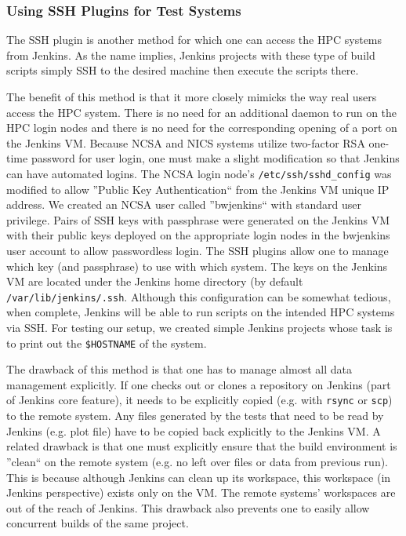 \documentclass[10pt, conference, compsocconf]{IEEEtran}
\begin{document}
\subsubsection{Using SSH Plugins for Test Systems}
The SSH plugin \cite{JenkinsSSHPlugin} is another method for which one can access the HPC systems from Jenkins. 
As the name implies, Jenkins projects with these type of build scripts simply SSH to the desired machine then execute the scripts there. 


The benefit of this method is that it more closely mimicks the way real users access the HPC system. 
There is no need for an additional daemon to run on the HPC login nodes and there is no need for the corresponding opening of a port on the Jenkins VM. 
Because NCSA and NICS systems utilize two-factor RSA one-time password for user login, one must make a slight modification so that Jenkins can have automated logins. 
The NCSA login node's \texttt{/etc/ssh/sshd_config} was modified to allow ''Public Key Authentication`` from the Jenkins VM unique IP address. 
We created an NCSA user called ''bwjenkins`` with standard user privilege. 
Pairs of SSH keys with passphrase were generated on the Jenkins VM with their public keys deployed on the appropriate login nodes in the bwjenkins user account to allow passwordless login. 
The SSH plugins allow one to manage which key (and passphrase) to use with which system. 
The keys on the Jenkins VM are located under the Jenkins home directory (by default \texttt{/var/lib/jenkins/.ssh}. 
Although this configuration can be somewhat tedious, when complete, Jenkins will be able to run scripts on the intended HPC systems via SSH. 
For testing our setup, we created simple Jenkins projects whose task is to print out the \texttt{\$HOSTNAME} of the system.

The drawback of this method is that one has to manage almost all data management explicitly. 
If one checks out or clones a repository on Jenkins (part of Jenkins core feature), it needs to be explicitly copied (e.g. with \texttt{rsync} or \texttt{scp}) to the remote system. 
Any files generated by the tests that need to be read by Jenkins (e.g. plot file) have to be copied back explicitly to the Jenkins VM. 
A related drawback is that one must explicitly ensure that the build environment is ''clean`` on the remote system (e.g. no left over files or data from previous run). 
This is because although Jenkins can clean up its workspace, this workspace (in Jenkins perspective) exists only on the VM. 
The remote systems' workspaces are out of the reach of Jenkins. 
This drawback also prevents one to easily allow concurrent builds of the same project. 
\end{document}
